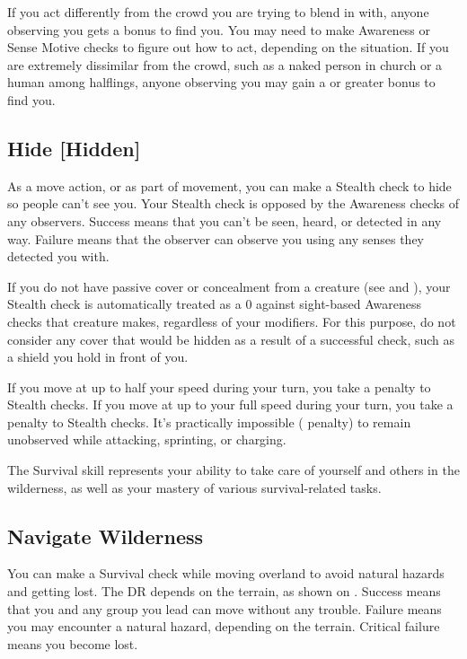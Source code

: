         If you act differently from the crowd you are trying to blend in with, anyone observing you gets a  bonus to find you. You may need to make Awareness or Sense Motive checks to figure out how to act, depending on the situation. If you are extremely dissimilar from the crowd, such as a naked person in church or a human among halflings, anyone observing you may gain a  or greater bonus to find you.

    \subsection{Hide [Hidden]}
        As a move action, or as part of movement, you can make a Stealth check to hide so people can't see you.
        Your Stealth check is opposed by the Awareness checks of any observers.
        Success means that you can't be seen, heard, or detected in any way.
        Failure means that the observer can observe you using any senses they detected you with.

        If you do not have passive cover or concealment from a creature (see  and ), your Stealth check is automatically treated as a 0 against sight-based Awareness checks that creature makes, regardless of your modifiers.
        For this purpose, do not consider any cover that would be hidden as a result of a successful check, such as a shield you hold in front of you.

        If you move at up to half your speed during your turn, you take a  penalty to Stealth checks. If you move at up to your full speed during your turn, you take a  penalty to Stealth checks. It's practically impossible ( penalty) to remain unobserved while attacking, sprinting, or charging.

\newpage
{}
        The Survival skill represents your ability to take care of yourself and others in the wilderness, as well as your mastery of various survival-related tasks.

    \subsection{Navigate Wilderness}
        You can make a Survival check while moving overland to avoid natural hazards and getting lost. The DR depends on the terrain, as shown on . Success means that you and any group you lead can move without any trouble. Failure means you may encounter a natural hazard, depending on the terrain. Critical failure means you become lost.

